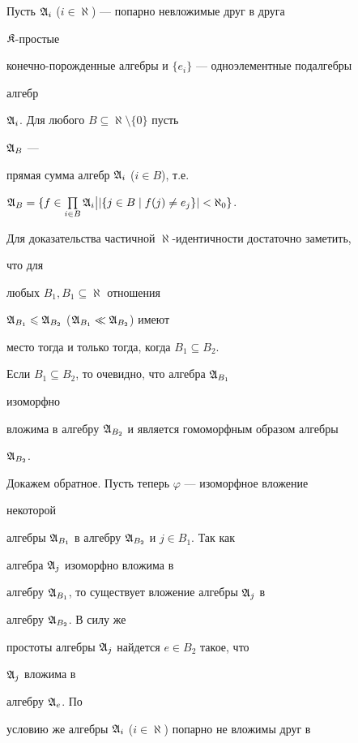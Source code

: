 \begin{pf}


Пусть $\frak A_i$ ($i\in\aleph$) --- попарно невложимые друг в друга


$\frak K$-простые


конечно-порожденные алгебры и $\{e_i\}$ --- одноэлементные подалгебры


алгебр


$\frak A_i$. Для любого $B\subseteq\aleph\setminus\{0\}$ пусть


$\frak A_B$ ---


прямая сумма алгебр $\frak A_i$ ($i\in B$), т.е.


$\frak A_B=\{f\in\prod\limits_{i\in B}\frak A_i\bigl|\bigr.


|\{j\in B\mid f(j)\ne e_j\}|<\aleph_0\}$.





Для доказательства частичной $\aleph$-идентичности достаточно заметить,


что для


любых $B_1,B_1\subseteq\aleph$ отношения


$\frak A_{B_1}\leqslant\frak A_{B_2}$ ($\frak A_{B_1}\ll\frak A_{B_2}$) имеют


место тогда и только тогда, когда $B_1\subseteq B_2$.


Если $B_1\subseteq B_2$, то очевидно, что алгебра $\frak A_{B_1}$


изоморфно


вложима в алгебру $\frak A_{B_2}$ и является гомоморфным образом алгебры


$\frak A_{B_2}$.





Докажем обратное. Пусть теперь $\varphi$ --- изоморфное вложение


некоторой


алгебры $\frak A_{B_1}$ в алгебру $\frak A_{B_2}$ и $j\in B_1$. Так как


алгебра $\frak A_j$ изоморфно вложима в


алгебру $\frak A_{B_1}$, то существует вложение алгебры $\frak A_j$ в


алгебру $\frak A_{B_2}$. В силу же


простоты алгебры $\frak A_j$ найдется $e\in B_2$ такое, что


$\frak A_j$ вложима в


алгебру $\frak A_e$. По


условию же алгебры $\frak A_i$ ($i\in\aleph$) попарно не вложимы друг в



\end{pf}
